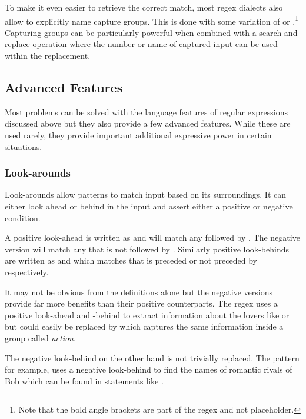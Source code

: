 To make it even easier to retrieve the correct match, most regex dialects also allow to explicitly name capture groups. This is done with some variation of  or .\footnote{Note that the bold angle brackets are part of the regex and not placeholder.} Capturing groups can be particularly powerful when combined with a search and replace operation where the number or name of captured input can be used within the replacement.

\subsection{Advanced Features}

Most problems can be solved with the language features of regular expressions discussed above but they also provide a few advanced features. While these are used rarely, they provide important additional expressive power in certain situations.

\subsubsection{Look-arounds}

Look-arounds allow patterns to match input based on its surroundings. It can either look ahead or behind in the input and assert either a positive or negative condition.

A positive look-ahead is written as  and will match any  followed by . The negative version  will match any  that is not followed by . Similarly positive look-behinds are written as  and  which matches  that is preceded or not preceded by  respectively.

It may not be obvious from the definitions alone but the negative versions provide far more benefits than their positive counterparts. The regex  uses a positive look-ahead and -behind to extract information about the lovers like  or  but could easily be replaced by  which captures the same information inside a group called \emph{action}.

The negative look-behind on the other hand is not trivially replaced. The pattern  for example, uses a negative look-behind to find the names of romantic rivals of Bob which can be found in statements like .

